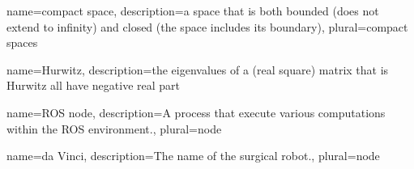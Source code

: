 {name={compact space},
 description={a space that is both bounded (does not extend to infinity) and closed (the space includes its boundary)},
 plural={compact spaces}
}

{name={Hurwitz},
 description={the eigenvalues of a (real square) matrix that is Hurwitz all have negative real part}
}

{name=ROS node,
 description={A process that execute various computations within the ROS environment.},
 plural={node}
}


{name=da Vinci,
 description={The name of the surgical robot.},
 plural={node}
}

